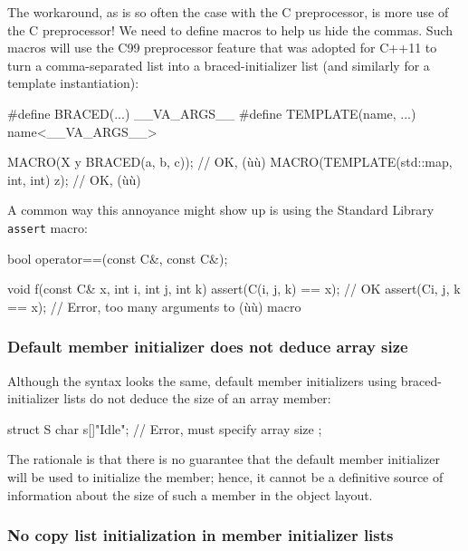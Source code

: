 The workaround, as is so often the case with the C preprocessor, is more
use of the C preprocessor! We need to define macros to help us hide the
commas. Such macros will use the  C99
preprocessor feature that was adopted for C++11 to turn a
comma-separated list into a braced-initializer list (and similarly for a
template instantiation):

\begin{emcppslisting}
#define BRACED(...) { __VA_ARGS__ }
#define TEMPLATE(name, ...) name<__VA_ARGS__>

MACRO(X y BRACED(a, b, c));             // OK, (ù{}ù)
MACRO(TEMPLATE(std::map, int, int) z);  // OK, (ù{}ù)
\end{emcppslisting}


\noindent A common way this annoyance might show up is using the Standard Library
\lstinline!assert! macro:

\begin{emcppslisting}
bool operator==(const C&, const C&);

void f(const C& x, int i, int j, int k)
{
   assert(C(i, j, k) == x);  // OK
   assert(C{i, j, k} == x);  // Error, too many arguments to (ù{}ù) macro
}
\end{emcppslisting}


\subsubsection[Default member initializer does not deduce array size]{Default member initializer does not deduce array size}\label{default-member-initializer-does-not-deduce-array-size}

Although the syntax looks the same, default member initializers using
braced-initializer lists do not deduce the size of an array member:

\begin{emcppslisting}
struct S
{
    char s[]{"Idle"};  // Error, must specify array size
};
\end{emcppslisting}


\noindent The rationale is that there is no guarantee that the default member
initializer will be used to initialize the member; hence, it cannot be a
definitive source of information about the size of such a member in the
object layout.

\subsubsection[No copy list initialization in member initializer lists]{No copy list initialization in member initializer lists}\label{no-copy-list-initialization-in-member-initializer-lists}

